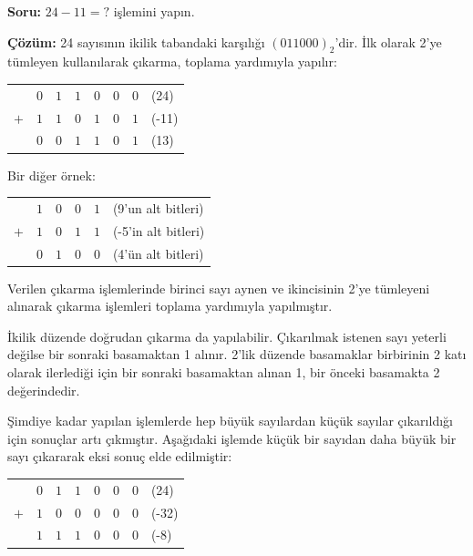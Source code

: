 \begin{ornek}[5.2]
\textbf{Soru:} $24 - 11 = ?$ işlemini yapın.

\textbf{Çözüm:} 24 sayısının ikilik tabandaki karşılığı $(011000)_2$'dir. İlk olarak 2'ye tümleyen kullanılarak çıkarma, toplama yardımıyla yapılır:

\begin{center}
\begin{tabular}{r c c c c c c l}
  & $0$ & $1$ & $1$ & $0$ & $0$ & $0$ & (24) \\
$+$ & $1$ & $1$ & $0$ & $1$ & $0$ & $1$ & (-11) \\
\hline
  & $0$ & $0$ & $1$ & $1$ & $0$ & $1$ & (13) \\
\end{tabular}
\end{center}

Bir diğer örnek:
\begin{center}
\begin{tabular}{r c c c c l}
  & $1$ & $0$ & $0$ & $1$ & (9'un alt bitleri) \\
$+$ & $1$ & $0$ & $1$ & $1$ & (-5'in alt bitleri) \\
\hline
  & $0$ & $1$ & $0$ & $0$ & (4'ün alt bitleri) \\
\end{tabular}
\end{center}

Verilen çıkarma işlemlerinde birinci sayı aynen ve ikincisinin 2'ye tümleyeni alınarak çıkarma işlemleri toplama yardımıyla yapılmıştır.

İkilik düzende doğrudan çıkarma da yapılabilir. Çıkarılmak istenen sayı yeterli değilse bir sonraki basamaktan 1 alınır. 2'lik düzende basamaklar birbirinin 2 katı olarak ilerlediği için bir sonraki basamaktan alınan 1, bir önceki basamakta 2 değerindedir.
\end{ornek}

Şimdiye kadar yapılan işlemlerde hep büyük sayılardan küçük sayılar çıkarıldığı için sonuçlar artı çıkmıştır. Aşağıdaki işlemde küçük bir sayıdan daha büyük bir sayı çıkararak eksi sonuç elde edilmiştir:

\begin{center}
\begin{tabular}{r c c c c c c l}
  & $0$ & $1$ & $1$ & $0$ & $0$ & $0$ & (24)  \\
$+$ & $1$ & $0$ & $0$ & $0$ & $0$ & $0$ & (-32) \\
\hline
  & $1$ & $1$ & $1$ & $0$ & $0$ & $0$ & (-8) \\
\end{tabular}
\end{center}

